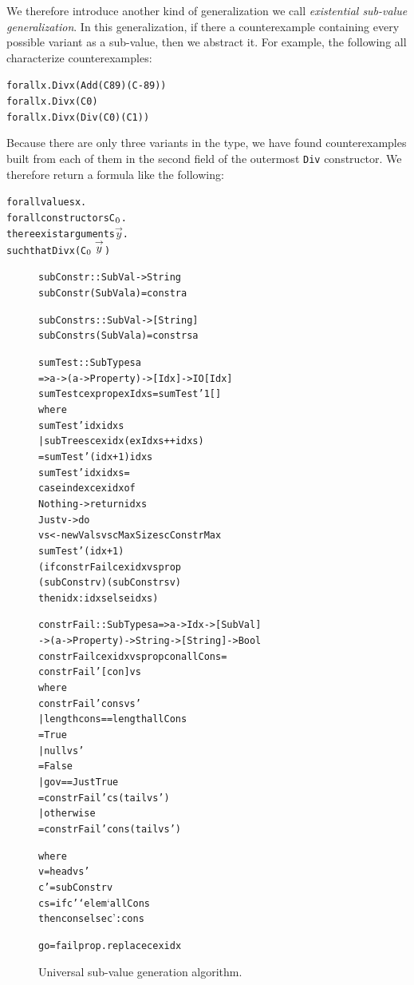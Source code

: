 \documentclass[10pt]{sigplanconf}
\newenvironment{code}{\begin{alltt}}{\end{alltt}}
\newcommand{\ttp}[1]{\texttt{#1}}
\begin{document}
We therefore introduce another kind of generalization we call \emph{existential
  sub-value generalization}.  In this generalization, if there a counterexample
containing every possible variant as a sub-value, then we abstract it.  For
example, the following all characterize counterexamples:
%
\begin{code}
forall x . Div x (Add (C 89) (C -89))
forall x . Div x (C 0)
forall x . Div x (Div (C 0) (C 1))
\end{code}
%
\noindent
Because there are only three variants in the type, we have found counterexamples
built from each of them in the second field of the outermost \ttp{Div}
constructor.  We therefore return a formula like the following:
%
\begin{code}
forall values x .
  forall constructors C\(\sb{0}\) .
    there exist arguments \(\stackrel{\rightarrow}{y}\) .
      such that Div x (C\(\sb{0} \stackrel{\rightarrow}{y}\))
\end{code}
%

\begin{figure}
  \begin{code}
subConstr :: SubVal -> String
subConstr (SubVal a) = constr a

subConstrs :: SubVal -> [String]
subConstrs (SubVal a) = constrs a

sumTest :: SubTypes a
          => a -> (a -> Property) -> [Idx] -> IO [Idx]
sumTest cex prop exIdxs = sumTest' 1 []
  where
  sumTest' idx idxs
    | subTrees cex idx (exIdxs ++ idxs)
    = sumTest' (idx+1) idxs
  sumTest' idx idxs =
    case index cex idx of
      Nothing -> return idxs
      Just v  -> do
        vs <- newVals v scMaxSize scConstrMax
        sumTest' (idx+1)
          (if constrFail cex idx vs prop
                (subConstr v) (subConstrs v)
             then idx:idxs else idxs)

constrFail :: SubTypes a => a -> Idx -> [SubVal]
  -> (a -> Property) -> String -> [String] -> Bool
constrFail cex idx vs prop con allCons =
  constrFail' [con] vs
  where
  constrFail' cons vs'
    | length cons == length allCons
    = True
    | null vs'
    = False
    | go v == Just True
    = constrFail' cs (tail vs')
    | otherwise
    = constrFail' cons (tail vs')

    where
    v  = head vs'
    c' = subConstr v
    cs = if c' `elem` allCons
           then cons else c':cons

  go = fail prop . replace cex idx
  \end{code}
  \caption{Universal sub-value generation algorithm.}
  \label{fig:constrs}
\end{figure}
\end{document}

